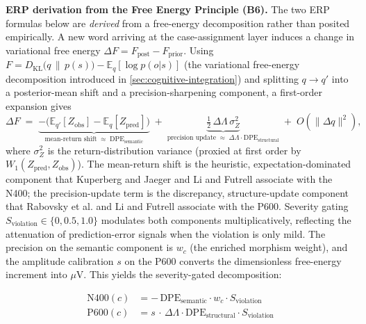 \documentclass[
]{article}
\begin{document}
\textbf{ERP derivation from the Free Energy Principle (B6).} The two ERP
formulas below are \emph{derived} from a free-energy decomposition
rather than posited empirically. A new word arriving at the
case-assignment layer induces a change in variational free energy
\(\Delta F = F_{\text{post}} - F_{\text{prior}}\). Using
\(F = D_{\mathrm{KL}}\bigl(q \,\|\, p(s)\bigr) - \mathbb{E}_q[\log p(o|s)]\)
(the variational free-energy decomposition introduced in
\autoref{sec:cognitive-integration}) and splitting \(q \to q'\) into a
posterior-mean shift and a precision-sharpening component, a first-order
expansion gives \begin{equation*}
\Delta F \;=\; \underbrace{-\bigl(\mathbb{E}_{q'}[Z_{\text{obs}}] - \mathbb{E}_{q}[Z_{\text{pred}}]\bigr)}_{\text{mean-return shift}\;\approx\;\mathrm{DPE}_{\text{semantic}}} \;+\; \underbrace{\tfrac{1}{2}\,\Delta\Lambda\,\sigma_Z^{2}}_{\text{precision update}\;\approx\;\Delta\Lambda \cdot \mathrm{DPE}_{\text{structural}}} \;+\; O(\|\Delta q\|^2),
\end{equation*} where \(\sigma_Z^2\) is the return-distribution variance
(proxied at first order by \(W_1(Z_{\text{pred}}, Z_{\text{obs}})\)).
The mean-return shift is the heuristic, expectation-dominated component
that Kuperberg and Jaeger \citeyearpar{kuperberg2016mean} and Li and
Futrell \citeyearpar{li2023decomposition} associate with the N400; the
precision-update term is the discrepancy, structure-update component
that Rabovsky et al. \citeyearpar{rabovsky2018modelling} and Li and
Futrell \citeyearpar{li2024shallow} associate with the P600. Severity
gating \(S_{\text{violation}} \in \{0, 0.5, 1.0\}\) modulates both
components multiplicatively, reflecting the attenuation of
prediction-error signals when the violation is only mild. The precision
on the semantic component is \(w_c\) (the enriched morphism weight), and
the amplitude calibration \(s\) on the P600 converts the dimensionless
free-energy increment into \texorpdfstring{\ensuremath{\mu}}{mu}V. This yields the severity-gated
decomposition:

\begin{align}
\mathrm{N400}(c) &= -\,\mathrm{DPE}_{\text{semantic}} \cdot w_c \cdot S_{\text{violation}} \label{eq:eq-7c-n400} \\
\mathrm{P600}(c) &= s\,\cdot\,\Delta\Lambda \cdot \mathrm{DPE}_{\text{structural}} \cdot S_{\text{violation}} \label{eq:eq-7c-p600}
\end{align}
\end{document}
